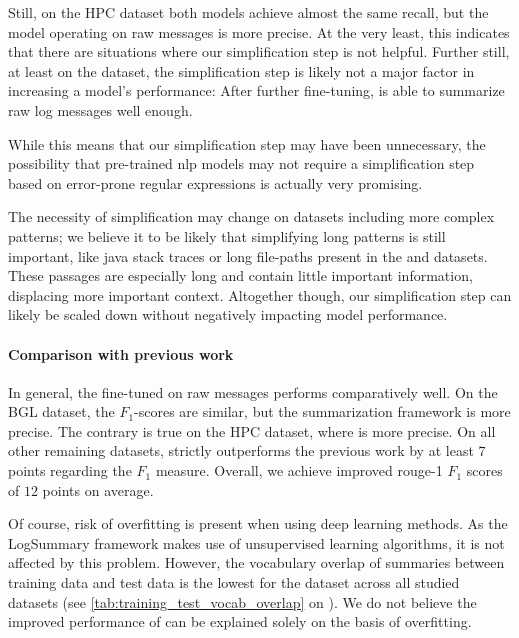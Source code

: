 Still, on the HPC dataset both models achieve almost the same recall, but the model operating on raw messages is more precise.
At the very least, this indicates that there are situations where our simplification step is not helpful.
Further still, at least on the \logsummary{} dataset, the simplification step is likely not a major factor in increasing a model's performance:
After further fine-tuning,  is able to summarize raw log messages well enough.

While this means that our simplification step may have been unnecessary,
the possibility that pre-trained \ac{nlp} models may not require a simplification step
based on error-prone regular expressions is actually very promising.

The necessity of simplification may change on datasets including more complex patterns;
we believe it to be likely that simplifying long patterns is still important,
like java stack traces or long file-paths present in the \hadoop{} and \telco{} datasets.
These passages are especially long and contain little important information, displacing more important context.
Altogether though, our simplification step can likely be scaled down without negatively impacting model performance.

\paragraph{Comparison with previous work}

In general, the  fine-tuned on raw messages performs comparatively well.
On the BGL dataset, the \(F_1\)-scores are similar, but the summarization framework is more precise.
The contrary is true on the HPC dataset, where  is more precise.
On all other remaining datasets,  strictly outperforms the previous work by at least \(7\) points regarding the \(F_1\) measure.
Overall, we achieve improved \acs*{rouge}-1 \(F_1\) scores of \(12\) points on average.

Of course, risk of overfitting is present when using deep learning methods.
As the LogSummary framework makes use of unsupervised learning algorithms, it is not affected by this problem.
However, the vocabulary overlap of summaries between training data and test data
is the lowest for the \logsummary{} dataset across all studied datasets
(see \autoref{tab:training_test_vocab_overlap} on ).
We do not believe the improved performance of  can be explained solely on the basis of overfitting.

